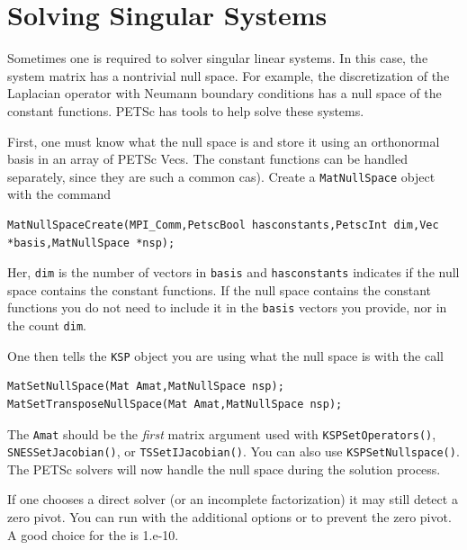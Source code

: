 \section{Solving Singular Systems}
\label{sec_singular}

Sometimes one is required to solver singular linear systems. 
In this case, the system matrix has a nontrivial null space. For example, the 
discretization of the Laplacian operator with Neumann boundary conditions
has a null space of the constant functions. PETSc has tools to help
solve these systems.

First, one must know what the null space is and store it using an orthonormal basis
in an array of PETSc Vecs. The constant functions can be handled separately, since
they are such a common cas). Create a \lstinline{MatNullSpace} object with the command
\begin{lstlisting}
MatNullSpaceCreate(MPI_Comm,PetscBool hasconstants,PetscInt dim,Vec *basis,MatNullSpace *nsp);
\end{lstlisting}
Her, \lstinline{dim} is the number of vectors in \lstinline{basis} and \lstinline{hasconstants} indicates
if the null space contains the constant functions. If the null space contains the constant
functions you do not need to include it in the \lstinline{basis} vectors you provide, nor in the count \lstinline{dim}.

One then tells the \lstinline{KSP} object you are using what the null space is with the call
\begin{lstlisting}
MatSetNullSpace(Mat Amat,MatNullSpace nsp);
MatSetTransposeNullSpace(Mat Amat,MatNullSpace nsp);
\end{lstlisting}
The \lstinline{Amat} should be the \emph{first} matrix argument used with \lstinline{KSPSetOperators()}, \lstinline{SNESSetJacobian()}, or \lstinline{TSSetIJacobian()}. You can also use \lstinline{KSPSetNullspace()}.
The PETSc solvers will now handle the null space during the solution process.

If one chooses a direct solver (or an incomplete factorization)
it may still detect a zero pivot. 
You can run with the additional options
 or
    to
prevent the zero pivot. A good choice for the  is 1.e-10.

